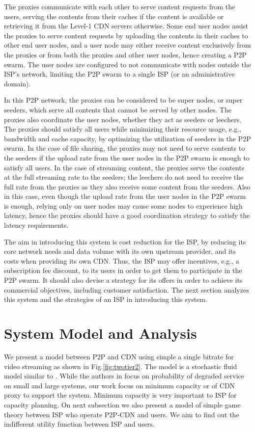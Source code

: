 \documentclass[paper]{ieice}
\begin{document}
The proxies communicate with each other to serve content requests from the users, serving the contents from their caches if the content is available 
or retrieving it from the Level-1 CDN servers otherwise.
Some end user nodes assist the proxies to serve content requests by
uploading the contents in their caches to other end user nodes, and a
user node may either receive content exclusively from the proxies or
from both the proxies and other user nodes, hence creating a P2P swarm.
The user nodes are configured to not communicate with nodes outside
the ISP's network, limiting the P2P swarm to a single ISP (or an administrative domain).

In this P2P network, the proxies can be considered to be super nodes,
or super seeders, which serve all contents that cannot be served by
other nodes.  The proxies also coordinate the user nodes, whether they
act as seeders or leechers.  The proxies should satisfy all users
while minimizing their resource usage, e.g., bandwidth and cache
capacity, by optimizing the utilization of seeders in the P2P swarm.
In the case of file sharing, the proxies may not need to serve
contents to the seeders if the upload rate from the user nodes in the
P2P swarm is enough to satisfy all users.  In the case of streaming
content, the proxies serve the contents at the full streaming rate to
the seeders; the leechers do not need to receive the full rate from
the proxies as they also receive some content from the seeders.  Also
in this case, even though the upload rate from the user nodes in the
P2P swarm is enough, relying only on user nodes may cause some nodes
to experience high latency, hence the proxies should have a good
coordination strategy to satisfy the latency requirements.

The aim in introducing this system is cost reduction for the ISP, by
reducing its core network needs and data volume with its own upstream
provider, and its costs when providing its own CDN.  Thus, the ISP may
offer incentives, e.g., a subscription fee discount, to its users in
order to get them to participate in the P2P swarm.  It should also
devise a strategy for its offers in order to achieve its commercial
objectives, including customer satisfaction.  The next section
analyzes this system and the strategies of an ISP in introducing this
system.


  
 
\section{System Model and Analysis}\label{systemmodel}
We present a model between P2P and CDN using simple a single bitrate for video streaming as shown in Fig.\ref{fig:twotier2}. 
The model is a stochastic fluid model similar to \cite{4215694}.
While the authors in \cite{4215694} focus on probability of degraded service on small and large systems, our work focus on minimum capacity or of CDN proxy to support the system.
Minimum capacity is very important to ISP for capacity planning.
On next subsection we also present a model of simple game theory between ISP who operate P2P-CDN and users.
We aim to find out the indifferent utility function between ISP and users.
\end{document}
